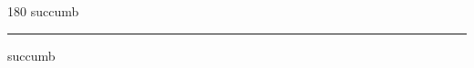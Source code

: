 
\begin{frame}
\begin{center}
\begin{turn}{180}
{\fontsize{2.5cm}{1em}\selectfont succumb}
\end{turn}
\vspace{1em}\par  
\hrule
\vspace{1em}\par  
{\fontsize{2.5cm}{1em}\selectfont succumb}
\end{center}
\end{frame}

